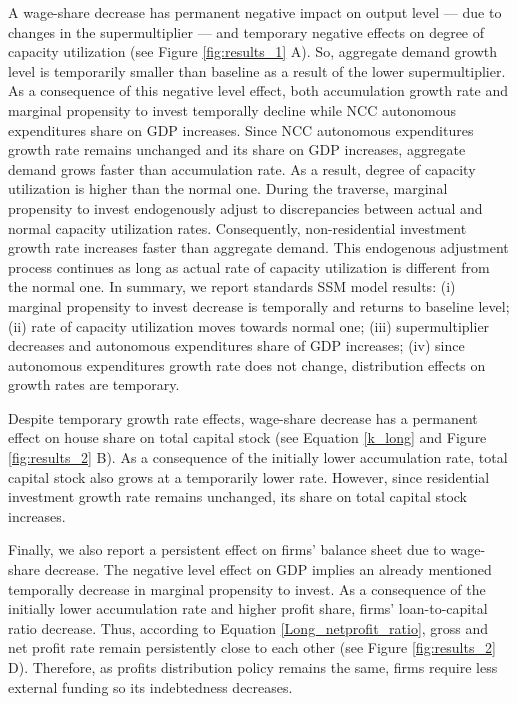 \documentclass[12pt]{article}
\begin{document}
A wage-share decrease has permanent negative impact on output level --- due to changes in the supermultiplier --- and temporary negative effects on degree of capacity utilization (see Figure \ref{fig:results_1} A).
So, aggregate demand growth level is temporarily smaller than baseline as a result of the lower supermultiplier.
As a consequence of this negative level effect, both accumulation growth rate and marginal propensity to invest temporally decline while NCC autonomous expenditures share on GDP increases.
Since NCC autonomous expenditures growth rate remains unchanged and its share on GDP increases, aggregate demand grows faster than accumulation rate.
As a result, degree of capacity utilization is higher than the normal one.
During the traverse, marginal propensity to invest endogenously adjust to discrepancies between actual and normal capacity utilization rates.
Consequently, non-residential investment growth rate increases faster than aggregate demand.
This endogenous adjustment process continues as long as actual rate of capacity utilization is different from the normal one.
In summary, we report standards SSM model results:
    (i) marginal propensity to invest decrease is temporally and returns to baseline level;
    (ii) rate of capacity utilization moves towards normal one;
    (iii) supermultiplier decreases and autonomous expenditures share of GDP increases;
    (iv) since autonomous expenditures growth rate does not change, distribution effects on growth rates are temporary. 


Despite temporary growth rate effects, wage-share decrease has a permanent effect on house share on total capital stock (see Equation \ref{k_long} and Figure \ref{fig:results_2} B).
As a consequence of the initially lower accumulation rate, total capital stock also grows at a temporarily lower rate.
However, since residential investment growth rate remains unchanged, its share on total capital stock increases.

Finally, we also report a persistent effect on firms' balance sheet due to wage-share decrease.
The negative level effect on GDP implies an already mentioned temporally decrease in marginal propensity to invest.
As a consequence of the initially lower accumulation rate and higher profit share, firms' loan-to-capital ratio decrease.
Thus, according to Equation \ref{Long_netprofit_ratio}, gross and net profit rate remain persistently close to each other (see Figure \ref{fig:results_2} D).
Therefore, as profits distribution policy remains the same, firms require less external funding so its indebtedness decreases.
\end{document}
